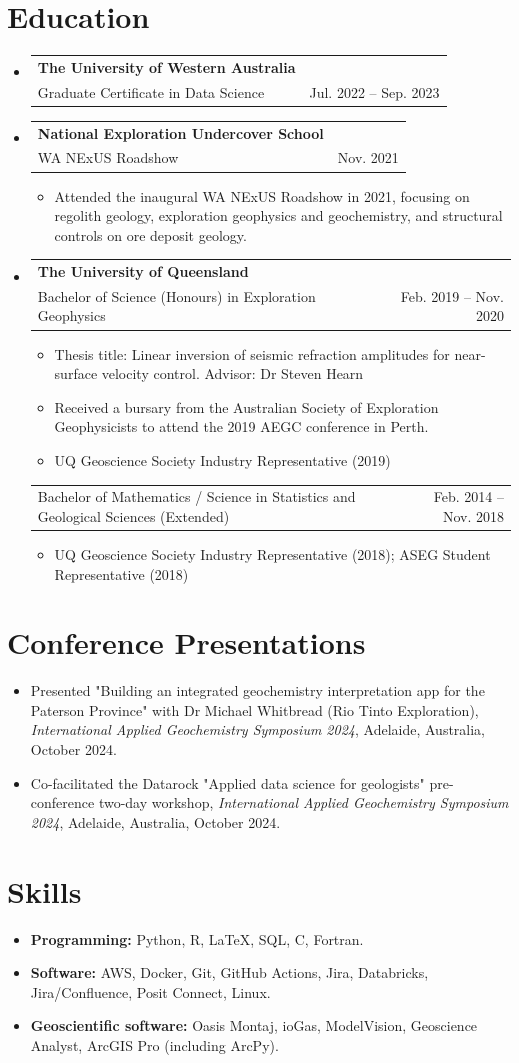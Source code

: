 \documentclass[letterpaper,11pt]{article}
\makeatletter
\newcommand{\resumeItem}[2]{
  \item\small{
    \textbf{#1}{#2 \vspace{-2pt}}
  }
}
\newcommand{\resumeSubheading}[4]{
  \vspace{-1pt}\item
    \begin{tabular*}{0.97\textwidth}[t]{l@{\extracolsep{\fill}}r}
      \textbf{#1} & #2 \\
      {\small #3} & {\small #4} \\
    \end{tabular*}\vspace{-5pt}
}
\newcommand{\resumeSubSubheading}[2]{
    \begin{tabular*}{0.97\textwidth}{l@{\extracolsep{\fill}}r}
      {\small#1} & {\small #2} \\
    \end{tabular*}\vspace{-5pt}
}
\newcommand{\resumeSubItem}[2]{\resumeItem{#1}{#2}\vspace{-4pt}}
\newcommand{\resumeSubHeadingListStart}{\begin{itemize}[leftmargin=*]}
\newcommand{\resumeSubHeadingListEnd}{\end{itemize}}
\newcommand{\resumeItemListStart}{\begin{itemize}}
\newcommand{\resumeItemListEnd}{\end{itemize}\vspace{-5pt}}
\makeatother
\begin{document}
\section{Education}
\resumeSubHeadingListStart
\resumeSubheading
    {The University of Western Australia}{}
    {Graduate Certificate in Data Science}{Jul. 2022 -- Sep. 2023}
\resumeSubheading
    {National Exploration Undercover School}{}
    {WA NExUS Roadshow}{Nov. 2021}
    \resumeItemListStart
      \resumeItem{}
        {Attended the inaugural WA NExUS Roadshow in 2021, focusing on regolith geology, exploration geophysics and geochemistry, and structural controls on ore deposit geology.}
    \resumeItemListEnd
\resumeSubheading
    {The University of Queensland}{}
    {Bachelor of Science (Honours) in Exploration Geophysics}{Feb. 2019 -- Nov. 2020}
    \resumeItemListStart
      \resumeItem{}
        {Thesis title: Linear inversion of seismic refraction amplitudes for near-surface velocity control. Advisor: Dr Steven Hearn}
      \resumeItem{}
        {Received a bursary from the Australian Society of Exploration Geophysicists to attend the 2019 AEGC conference in Perth.
        }
      \resumeItem{}
        {UQ Geoscience Society Industry Representative (2019)}
  \resumeItemListEnd
\resumeSubSubheading
    {Bachelor of Mathematics / Science in Statistics and Geological Sciences (Extended)}{Feb. 2014 -- Nov. 2018}
      \resumeItemListStart
        \resumeItem{}
          {UQ Geoscience Society Industry Representative (2018); ASEG Student Representative (2018)}
      \resumeItemListEnd
\resumeSubHeadingListEnd


\section{Conference Presentations}
  \resumeSubHeadingListStart
    \resumeSubItem{}
      {Presented "Building an integrated geochemistry interpretation app for the Paterson Province" with Dr Michael Whitbread (Rio Tinto Exploration), \textit{International Applied Geochemistry Symposium 2024}, Adelaide, Australia, October 2024.}
    \resumeSubItem{}
      {Co-facilitated the Datarock "Applied data science for geologists" pre-conference two-day workshop, \textit{International Applied Geochemistry Symposium 2024}, Adelaide, Australia, October 2024.}
  \resumeSubHeadingListEnd


\section{Skills}
  \resumeSubHeadingListStart
  \resumeSubItem{Programming: }{
    Python, R, \LaTeX, SQL, C, Fortran.
  }
  \resumeSubItem{Software: }{
    AWS, Docker, Git, GitHub Actions, Jira, Databricks, Jira/Confluence, Posit Connect, Linux.
  }
  \resumeSubItem{Geoscientific software: }{
    Oasis Montaj, ioGas, ModelVision, Geoscience Analyst, ArcGIS Pro (including ArcPy).
  }
  \resumeSubHeadingListEnd
\end{document}
